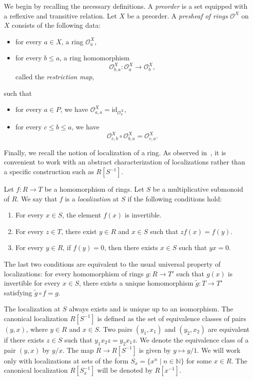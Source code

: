 \documentclass[reqno]{amsart}
\theoremstyle{definition}
\theoremstyle{remark}
\numberwithin{figure}{section}
\begin{document}
We begin by recalling the necessary definitions.
A \emph{preorder} is a set equipped with a reflexive and transitive relation.
Let $X$ be a preorder.
A \emph{presheaf of rings} $\mathcal{O}^X$ on $X$ consists of the following data:
\begin{itemize}
\item for every $a \in X$, a ring $\mathcal{O}^X_a$,
\item for every $b \leq a$, a ring homomorphism
\[
\mathcal{O}^X_{b,a} : \mathcal{O}^X_a \to \mathcal{O}^X_b,
\]
called the \emph{restriction map},
\end{itemize}
such that
\begin{itemize}
\item for every $a \in P$, we have $\mathcal{O}^X_{a,a} = \mathrm{id}_{\mathcal{O}^X_a}$,
\item for every $c \leq b \leq a$, we have
\[
\mathcal{O}^X_{c,b} \circ \mathcal{O}^X_{b,a} = \mathcal{O}^X_{c,a}.
\]
\end{itemize}

Finally, we recall the notion of localization of a ring.
As observed in~\cite[Section~4.1]{schemes-lean}, it is convenient to work with an abstract characterization of localizations rather than a specific construction such as $R[S^{-1}]$.

\begin{defn}
Let $f : R \to T$ be a homomorphism of rings.
Let $S$ be a multiplicative submonoid of $R$.
We say that $f$ is a \emph{localization} at $S$ if the following conditions hold:
\begin{enumerate}
\item \label{loc:inv} For every $x \in S$, the element $f(x)$ is invertible.
\item \label{loc:surj} For every $z \in T$, there exist $y \in R$ and $x \in S$ such that $z f(x) = f(y)$.
\item \label{loc:inj} For every $y \in R$, if $f(y) = 0$, then there exists $x \in S$ such that $y x = 0$.
\end{enumerate}
\end{defn}

The last two conditions are equivalent to the usual universal property of localizations:
for every homomorphism of rings $g : R \to T'$ such that $g(x)$ is invertible for every $x \in S$,
there exists a unique homomorphism $\widetilde{g} : T \to T'$ satisfying $\widetilde{g} \circ f = g$.

The localization at $S$ always exists and is unique up to an isomorphism.
The canonical localization $R[S^{-1}]$ is defined as the set of equivalence classes of pairs $(y,x)$, where $y \in R$ and $x \in S$.
Two pairs $(y_1,x_1)$ and $(y_2,x_2)$ are equivalent if there exists $z \in S$ such that $y_1 x_2 z = y_2 x_1 z$.
We denote the equivalence class of a pair $(y,x)$ by $y/x$.
The map $R \to R[S^{-1}]$ is given by $y \mapsto y/1$.
We will work only with localizations at sets of the form $S_x = \{ x^n \mid n \in \mathbb{N} \}$ for some $x \in R$.
The canonical localization $R[S_x^{-1}]$ will be denoted by $R[x^{-1}]$.
\end{document}
